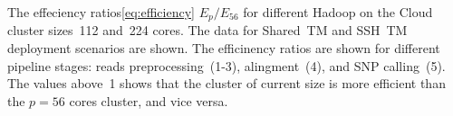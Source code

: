\documentclass{article}
\begin{document}
\begin{center}

\end{center}
The effeciency ratios\ref{eq:efficiency} $E_{p}/E_{56}$ for different  Hadoop on the Cloud cluster sizes~112  and~224 cores.
The data for Shared~TM and SSH~TM deployment scenarios are shown.
The efficinency ratios are shown for different pipeline stages: reads preprocessing~(1-3), alingment~(4), and SNP calling~(5).
The values above~1 shows that the cluster of current size is more efficient than the $p=56$ cores cluster, and vice versa. 
\end{document}
